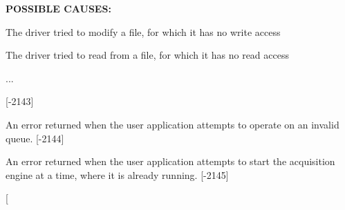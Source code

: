 \begin{Desc}
\begin{description}
{\bfseries P\+O\+S\+S\+I\+B\+L\+E C\+A\+U\+S\+E\+S\+:}


\begin{DoxyItemize}
\item The driver tried to modify a file, for which it has no write access
\item The driver tried to read from a file, for which it has no read access
\item ...
\end{DoxyItemize}

{\bfseries }\mbox{[}-\/2143\mbox{]} \item[{\em 
\hypertarget{group___common_interface_gga112225e5fbaaaef6445ff4ebf98f8e03a22a8a42c127ea2fe5774d48218199562}{D\+M\+R\+\_\+\+I\+N\+V\+A\+L\+I\+D\+\_\+\+Q\+U\+E\+U\+E\+\_\+\+S\+E\+L\+E\+C\+T\+I\+O\+N}\label{group___common_interface_gga112225e5fbaaaef6445ff4ebf98f8e03a22a8a42c127ea2fe5774d48218199562}
}]An error returned when the user application attempts to operate on an invalid queue. {\bfseries }\mbox{[}-\/2144\mbox{]} \item[{\em 
\hypertarget{group___common_interface_gga112225e5fbaaaef6445ff4ebf98f8e03a6460e5f2bb8430af27e29c42327b3608}{D\+M\+R\+\_\+\+A\+C\+Q\+U\+I\+S\+I\+T\+I\+O\+N\+\_\+\+E\+N\+G\+I\+N\+E\+\_\+\+B\+U\+S\+Y}\label{group___common_interface_gga112225e5fbaaaef6445ff4ebf98f8e03a6460e5f2bb8430af27e29c42327b3608}
}]An error returned when the user application attempts to start the acquisition engine at a time, where it is already running. {\bfseries }\mbox{[}-\/2145\mbox{]} \item[{\em 
}
\end{description}
\end{Desc}
